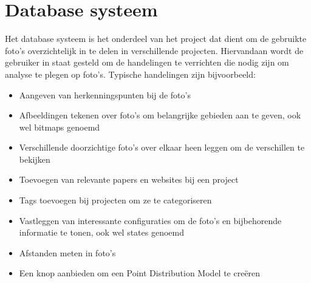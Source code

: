 \section{Database systeem}
\label{aanpak_database_systeem}
Het database systeem is het onderdeel van het project dat dient om de gebruikte foto's overzichtelijk in te delen in verschillende projecten. Hiervandaan wordt de gebruiker in staat gesteld om de handelingen te verrichten die nodig zijn om analyse te plegen op foto's. Typische handelingen zijn bijvoorbeeld: 

\begin{itemize}
\item Aangeven van herkenningspunten bij de foto's
\item Afbeeldingen tekenen over foto's om belangrijke gebieden aan te geven, ook wel bitmaps genoemd
\item Verschillende doorzichtige foto's over elkaar heen leggen om de verschillen te bekijken
\item Toevoegen van relevante papers en websites bij een project
\item Tags toevoegen bij projecten om ze te categoriseren
\item Vastleggen van interessante configuraties om de foto's en bijbehorende informatie te tonen, ook wel states genoemd
\item Afstanden meten in foto's
\item Een knop aanbieden om een Point Distribution Model te cre\"{e}ren
\end{itemize}

